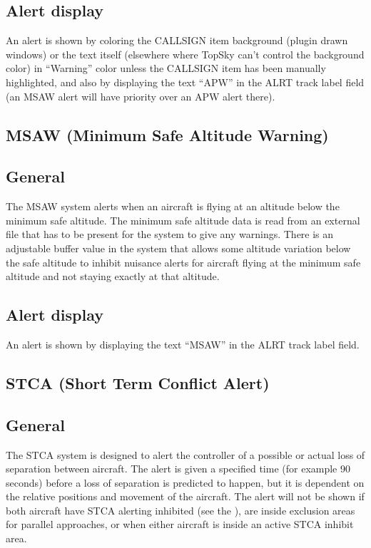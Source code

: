 \documentclass[11pt,a4paper,oldfontcommands]{memoir}
\begin{document}
\subsection*{Alert display}

An alert is shown by coloring the CALLSIGN item background (plugin drawn windows) or the text itself (elsewhere where TopSky can’t control the background color) in “Warning” color unless the CALLSIGN item has been manually highlighted, and also by displaying the text “APW” in the ALRT track label field (an MSAW alert will have priority over an APW alert there).

\subsection{MSAW (Minimum Safe Altitude Warning)}

\subsection*{General}

The MSAW system alerts when an aircraft is flying at an altitude below the minimum safe altitude. The minimum safe altitude data is read from an external file that has to be present for the system to give any warnings. There is an adjustable buffer value in the system that allows some altitude variation below the safe altitude to inhibit nuisance alerts for aircraft flying at the minimum safe altitude and not staying exactly at that altitude.

\subsection*{Alert display}

An alert is shown by displaying the text “MSAW” in the ALRT track label field.

\subsection{STCA (Short Term Conflict Alert)}

\subsection*{General}

The STCA system is designed to alert the controller of a possible or actual loss of separation between aircraft. The alert is given a specified time (for example 90 seconds) before a loss of separation is predicted to happen, but it is dependent on the relative positions and movement of the aircraft. The alert will not be shown if both aircraft have STCA alerting inhibited (see the \textit{}), are inside exclusion areas for parallel approaches, or when either aircraft is inside an active STCA inhibit area.
\end{document}
